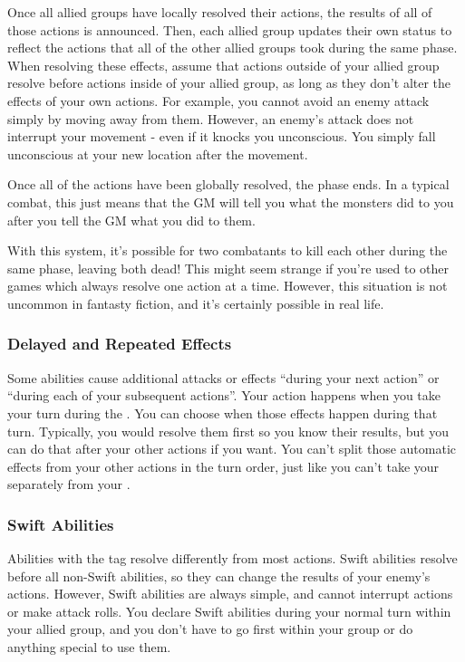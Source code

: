     Once all allied groups have locally resolved their actions, the results of all of those actions is announced.
    Then, each allied group updates their own status to reflect the actions that all of the other allied groups took during the same phase.
    When resolving these effects, assume that actions outside of your allied group resolve before actions inside of your allied group, as long as they don't alter the effects of your own actions.
    For example, you cannot avoid an enemy attack simply by moving away from them.
    However, an enemy's attack does not interrupt your movement - even if it knocks you unconscious.
    You simply fall unconscious at your new location after the movement.

    Once all of the actions have been globally resolved, the phase ends.
    In a typical combat, this just means that the GM will tell you what the monsters did to you after you tell the GM what you did to them.

    With this system, it's possible for two combatants to kill each other during the same phase, leaving both dead!
    This might seem strange if you're used to other games which always resolve one action at a time.
    However, this situation is not uncommon in fantasty fiction, and it's certainly possible in real life.

    \subsubsection{Delayed and Repeated Effects}
      Some abilities cause additional attacks or effects ``during your next action'' or ``during each of your subsequent actions''.
      Your action happens when you take your turn during the .
      You can choose when those effects happen during that turn.
      Typically, you would resolve them first so you know their results, but you can do that after your other actions if you want.
      You can't split those automatic effects from your other actions in the turn order, just like you can't take your  separately from your .

    \subsubsection{Swift Abilities}\label{Swift Abilities}
      Abilities with the  tag resolve differently from most actions.
      Swift abilities resolve before all non-Swift abilities, so they can change the results of your enemy's actions.
      However, Swift abilities are always simple, and cannot interrupt actions or make attack rolls.
      You declare Swift abilities during your normal turn within your allied group, and you don't have to go first within your group or do anything special to use them.

